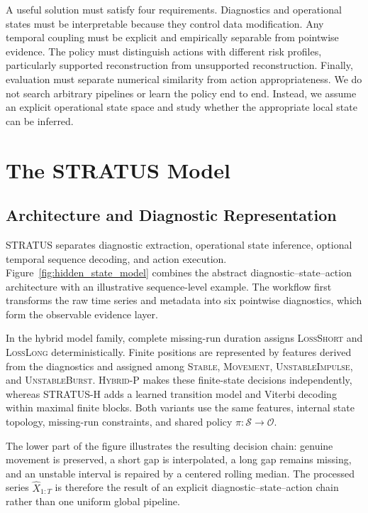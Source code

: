 \documentclass[sigconf,review]{acmart}
\newcommand{\STRATUS}{\textsc{STRATUS}\xspace}
\newcommand{\methodHP}{\textsc{Hybrid-P}\xspace}
\newcommand{\methodH}{\textsc{STRATUS-H}\xspace}
\begin{document}
A useful solution must satisfy four requirements. Diagnostics and
operational states must be interpretable because they control data
modification. Any temporal coupling must be explicit and empirically
separable from pointwise evidence. The policy must distinguish actions
with different risk profiles, particularly supported reconstruction
from unsupported reconstruction. Finally, evaluation must separate
numerical similarity from action appropriateness. We do not search
arbitrary pipelines or learn the policy end to end. Instead, we assume
an explicit operational state space and study whether the appropriate
local state can be inferred.



\section{The STRATUS Model}
\label{sec:model}
\subsection{Architecture and Diagnostic Representation}

\STRATUS separates diagnostic extraction, operational state inference,
optional temporal sequence decoding, and action execution.
Figure~\ref{fig:hidden_state_model} combines the abstract
diagnostic--state--action architecture with an illustrative
sequence-level example. The workflow first transforms the raw time
series and metadata into six pointwise diagnostics, which form the
observable evidence layer.

In the hybrid model family, complete missing-run duration assigns
\textsc{LossShort} and \textsc{LossLong} deterministically. Finite
positions are represented by features derived from the diagnostics and
assigned among \textsc{Stable}, \textsc{Movement},
\textsc{UnstableImpulse}, and \textsc{UnstableBurst}. \methodHP makes
these finite-state decisions independently, whereas \methodH adds a
learned transition model and Viterbi decoding within maximal finite
blocks. Both variants use the same features, internal state topology,
missing-run constraints, and shared policy
$\pi:\mathcal{S}\rightarrow\mathcal{O}$.

The lower part of the figure illustrates the resulting decision chain:
genuine movement is preserved, a short gap is interpolated, a long gap
remains missing, and an unstable interval is repaired by a centered
rolling median. The processed series $\widehat{X}_{1:T}$ is therefore
the result of an explicit diagnostic--state--action chain rather than
one uniform global pipeline.
\end{document}
